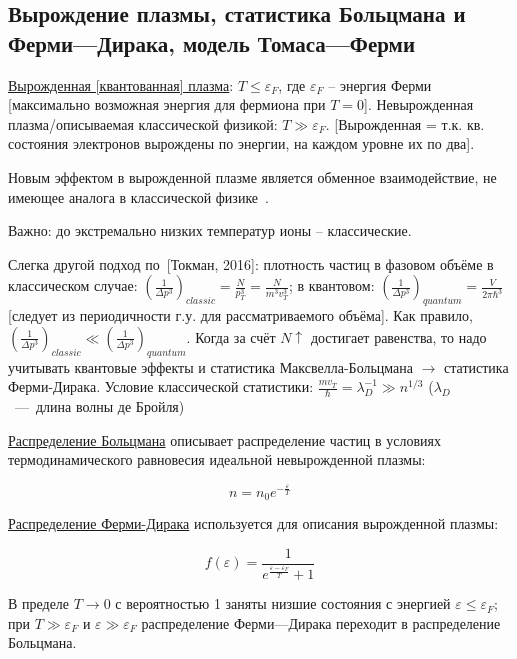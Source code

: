 \documentclass[10pt, a4paper]{article}
\newcommand{\Tokman}{~[Токман, 2016]}
\begin{document}
\subsection{Вырождение плазмы, статистика Больцмана и Ферми—Дирака, модель Томаса—Ферми}

\uline{Вырожденная [квантованная] плазма}: $T \leq \varepsilon_F$, где $\varepsilon_F$ -- энергия Ферми [максимально возможная энергия для фермиона при $T=0$]. Невырожденная плазма/описываемая классической физикой: $T \gg \varepsilon_F$. [Вырожденная = т.к. кв. состояния электронов вырождены по энергии, на каждом уровне их по два].

Новым эффектом в вырожденной плазме является обменное взаимодействие, не имеющее аналога в классической физике~\cite{kotelnikov}.

Важно: до экстремально низких температур ионы -- классические.

Слегка другой подход по\Tokman: плотность частиц в фазовом объёме в классическом случае: $\left( \frac{1}{\Delta p^3}\right)_{classic} = \frac{N}{p_T^3} = \frac{N}{m^3v_T^3}$; в квантовом: $\left(\frac{1}{\Delta p^3}\right)_{quantum} = \frac{V}{2 \pi \hbar^3}$ [следует из периодичности г.у. для рассматриваемого объёма]. Как правило, $\left( \frac{1}{\Delta p^3}\right)_{classic} \ll \left(\frac{1}{\Delta p^3}\right)_{quantum}$. Когда за счёт $N\uparrow$ достигает равенства, то надо учитывать квантовые эффекты и статистика Максвелла-Больцмана $\rightarrow$ статистика Ферми-Дирака. Условие классической статистики: $\frac{mv_T}{\hbar} = \lambda_D^{-1} \gg n^{1/3}$ ($\lambda_D$~---~длина волны де Бройля)

\uline{Распределение Больцмана} описывает распределение частиц в условиях термодинамического равновесия идеальной невырожденной плазмы:

\begin{equation}
	n = n_0e^{-\frac{\varepsilon}{T}}
\end{equation}

\uline{Распределение Ферми-Дирака} используется для описания вырожденной плазмы:

\begin{equation}
	f(\varepsilon) = \frac{1}{e^{\frac{\varepsilon-\varepsilon_F}{T}}+1}
\end{equation}

В пределе $T\rightarrow 0$ с вероятностью 1 заняты низшие состояния с энергией $\varepsilon \leq \varepsilon_F$; при $T \gg \varepsilon_F$ и $\varepsilon \gg \varepsilon_F$ распределение Ферми—Дирака переходит в распределение Больцмана.
\end{document}

